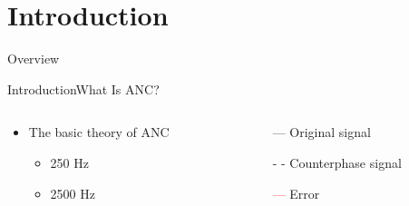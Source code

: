 \section{Introduction}
\begin{frame}{Overview}
\end{frame}

\begin{frame}{Introduction}{What Is ANC?}		
	\begin{columns}
		\begin{column}{0.5\textwidth}
				\begin{itemize}
					\item The basic theory of ANC
					\begin{itemize}
						\item  250 Hz
						\item 2500 Hz 
					\end{itemize}	
				\end{itemize}
			\vspace{-2.5mm}	
		\begin{center}
	 		
	 	\end{center}
		\end{column}
		\begin{column}{0.5\textwidth} 
			\begin{itemize}
				\item[\textcolor{MATLABblue}{---}] Original signal
				\item[\textcolor{MATLABblue}{- -}] Counterphase signal
				\item[\textcolor{red}{---}] Error
			\end{itemize}
		\begin{center}
	 		
	 	\end{center}
		\end{column}
	\end{columns}
\end{frame}

